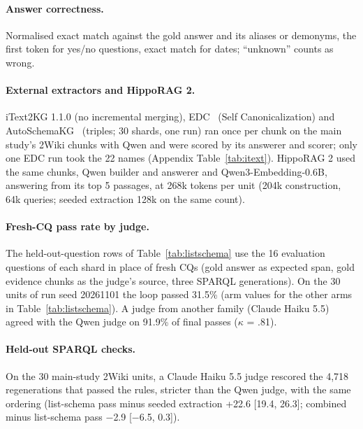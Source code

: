\paragraph{Answer correctness.} Normalised exact match against the gold answer and its aliases or demonyms, the first token for yes/no questions, exact match for dates; ``unknown'' counts as wrong.

\paragraph{External extractors and HippoRAG 2.}\label{app:external}
iText2KG 1.1.0 (no incremental merging), EDC~\cite{zhang2024edc} (Self Canonicalization) and AutoSchemaKG~\cite{bai2026autoschemakg} (triples; 30 shards, one run) ran once per chunk on the main study's 2Wiki chunks with Qwen and were scored by its answerer and scorer; only one EDC run took the 22 names (Appendix Table~\ref{tab:itext}). HippoRAG 2 used the same chunks, Qwen builder and answerer and Qwen3-Embedding-0.6B, answering from its top 5 passages, at 268k tokens per unit (204k construction, 64k queries; seeded extraction 128k on the same count).

\paragraph{Fresh-CQ pass rate by judge.}\label{app:freshcq}
The held-out-question rows of Table~\ref{tab:listschema} use the 16 evaluation questions of each shard in place of fresh CQs (gold answer as expected span, gold evidence chunks as the judge's source, three SPARQL generations). On the 30 units of run seed 20261101 the loop passed 31.5\% (arm values for the other arms in Table~\ref{tab:listschema}). A judge from another family (Claude Haiku 5.5) agreed with the Qwen judge on 91.9\% of final passes ($\kappa$ = .81).

\paragraph{Held-out SPARQL checks.}\label{app:sparqlchecks} On the 30 main-study 2Wiki units, a Claude Haiku 5.5 judge rescored the 4,718 regenerations that passed the rules, stricter than the Qwen judge, with the same ordering (list-schema pass minus seeded extraction +22.6 [19.4, 26.3]; combined minus list-schema pass $-$2.9 [$-$6.5, 0.3]).

